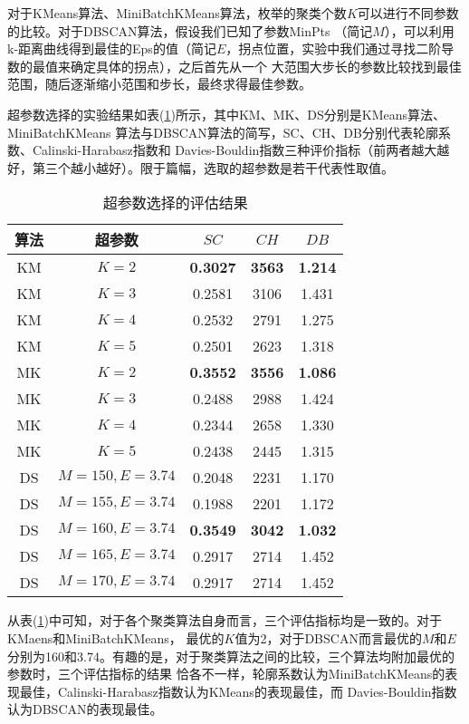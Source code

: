 \documentclass{acm_proc_article-sp}
\begin{document}
对于KMeans算法、MiniBatchKMeans算法，枚举的聚类个数$K$可以进行不同参数的比较。对于DBSCAN算法，假设我们已知了参数MinPts
（简记$M$），可以利用k-距离曲线得到最佳的Eps的值（简记$E$，拐点位置，实验中我们通过寻找二阶导数的最值来确定具体的拐点），之后首先从一个
大范围大步长的参数比较找到最佳范围，随后逐渐缩小范围和步长，最终求得最佳参数。

超参数选择的实验结果如表(\ref{ARG})所示，其中KM、MK、DS分别是KMeans算法、MiniBatchKMeans
算法与DBSCAN算法的简写，SC、CH、DB分别代表轮廓系数、Calinski-Harabasz指数和
Davies-Bouldin指数三种评价指标（前两者越大越好，第三个越小越好）。限于篇幅，选取的超参数是若干代表性取值。

\begin{table}[!htb]
\centering
\caption{超参数选择的评估结果}
\begin{tabular}{@{}ccccc@{}}\toprule
算法     & 超参数 & $\mathit{SC}$ & $\mathit{CH}$ & $\mathit{DB}$  \\ \midrule
KM & $K=2$   & \textbf{0.3027} & \textbf{3563} & \textbf{1.214}\\
KM & $K=3$   & 0.2581 & 3106 & 1.431\\
KM & $K=4$   & 0.2532 & 2791 & 1.275\\
KM & $K=5$   & 0.2501 & 2623 & 1.318\\\midrule
MK & $K=2$   & \textbf{0.3552} & \textbf{3556} & \textbf{1.086}\\
MK & $K=3$   & 0.2488 & 2988 & 1.424\\
MK & $K=4$   & 0.2344 & 2658 & 1.330\\
MK & $K=5$   & 0.2438 & 2445 & 1.315\\\midrule  
DS & $M=150,E=3.74$    & 0.2048 & 2231 & 1.170\\
DS & $M=155,E=3.74$    & 0.1988 & 2201 & 1.172\\
DS & $M=160,E=3.74$    & \textbf{0.3549} & \textbf{3042} & \textbf{1.032}\\
DS & $M=165,E=3.74$    & 0.2917 & 2714 & 1.452\\
DS & $M=170,E=3.74$    & 0.2917 & 2714 & 1.452\\\bottomrule
\end{tabular}
\label{ARG}
\end{table}

从表(\ref{ARG})中可知，对于各个聚类算法自身而言，三个评估指标均是一致的。对于KMaens和MiniBatchKMeans，
最优的$K$值为2，对于DBSCAN而言最优的$M$和$E$分别为160和3.74。有趣的是，对于聚类算法之间的比较，三个算法均附加最优的参数时，三个评估指标的结果
恰各不一样，轮廓系数认为MiniBatchKMeans的表现最佳，Calinski-Harabasz指数认为KMeans的表现最佳，而
Davies-Bouldin指数认为DBSCAN的表现最佳。
\end{document}
